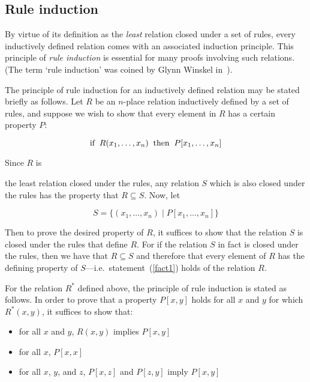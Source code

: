 \documentclass[twocolumn,fleqn,layout]{article}
\begin{document}
\subsection{Rule induction}\label{rule-ind}

By virtue of its definition as the {\it least\/} relation closed under a set of
rules, every inductively defined relation comes with an associated induction
principle.  This principle of {\it rule induction\/} is essential for many
proofs involving such relations. (The term `rule induction' was coined by Glynn
Winskel in~\cite{winskel}).

The principle of rule induction for an inductively defined relation may be
stated briefly as follows. Let $R$ be an $n$-place relation inductively defined
by a set of rules, and suppose we wish to show that every element in $R$ has a
certain property $P$:

{\samepage
\begin{equation}\label{fact1}
\hbox{\rm
if}\;\;R(x_1,\dots,x_n)\;\;\hbox{then}\;\;P[x_1,\dots,x_n]
\end{equation}

\noindent Since $R$ is} \pagebreak[3] the least relation closed under the
rules, any relation $S$ which is also closed under the rules has the property
that $R \subseteq S$.  Now, let

\[S = \{(x_1,\dots,x_n) \mid P[x_1,\dots,x_n]\}\]

\noindent Then to prove the desired property of $R$, it suffices to show that
the relation $S$ is closed under the rules that define $R$. For if the relation
$S$ in fact is closed under the rules, then we have that $R \subseteq S$ and
therefore that every element of $R$ has the defining property of $S$---i.e.\
statement~(\ref{fact1}) holds of the relation $R$.

For the relation $R^{*}$ defined above, the principle of rule induction is
stated as follows. In order to prove that a property $P[x,y]$ holds for all
$x$ and $y$ for which $R^{*}(x,y)$, it suffices to show that:

\begin{itemize}

\item for all $x$ and $y$, $R(x,y)$ implies $P[x,y]$

\item for all $x$, $P[x,x]$

\item for all $x$, $y$, and $z$, $P[x,z]$ and $P[z,y]$ imply $P[x,y]$

\end{itemize}
\end{document}
